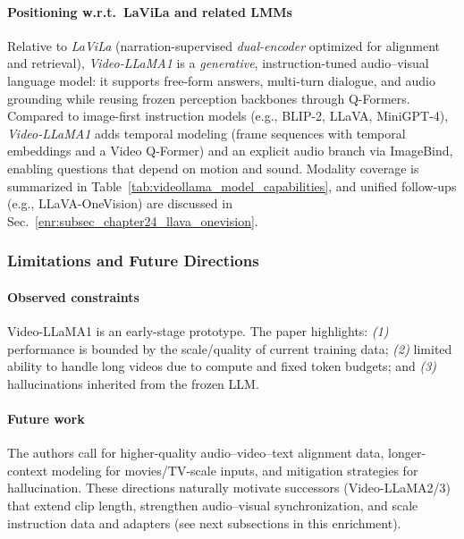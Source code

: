 \begin{enrichment}
\begin{enrichment}
        \paragraph{Positioning w.r.t.\ LaViLa and related LMMs}
        Relative to \emph{LaViLa} (narration-supervised \emph{dual-encoder} optimized for alignment and retrieval), \emph{Video\mbox{-}LLaMA1} is a \emph{generative}, instruction-tuned audio–visual language model: it supports free-form answers, multi-turn dialogue, and audio grounding while reusing frozen perception backbones through Q-Formers. Compared to image-first instruction models (e.g., BLIP-2, LLaVA, MiniGPT-4), \emph{Video\mbox{-}LLaMA1} adds temporal modeling (frame sequences with temporal embeddings and a Video Q-Former) and an explicit audio branch via ImageBind, enabling questions that depend on motion and sound. Modality coverage is summarized in Table~\ref{tab:videollama_model_capabilities}, and unified follow-ups (e.g., LLaVA-OneVision) are discussed in Sec.~\ref{enr:subsec_chapter24_llava_onevision}.
        
        \subsubsection{Limitations and Future Directions}
        \label{subsubsec:chapter24_videollama1_limits}
        
        \paragraph{Observed constraints}
        Video-LLaMA1 is an early-stage prototype. The paper highlights: \textit{(1)} performance is bounded by the scale/quality of current training data; \textit{(2)} limited ability to handle long videos due to compute and fixed token budgets; and \textit{(3)} hallucinations inherited from the frozen LLM.
        
        \paragraph{Future work}
        The authors call for higher-quality audio–video–text alignment data, longer-context modeling for movies/TV-scale inputs, and mitigation strategies for hallucination. These directions naturally motivate successors (Video-LLaMA2/3) that extend clip length, strengthen audio–visual synchronization, and scale instruction data and adapters (see next subsections in this enrichment).
        

\end{enrichment}
\end{enrichment}
